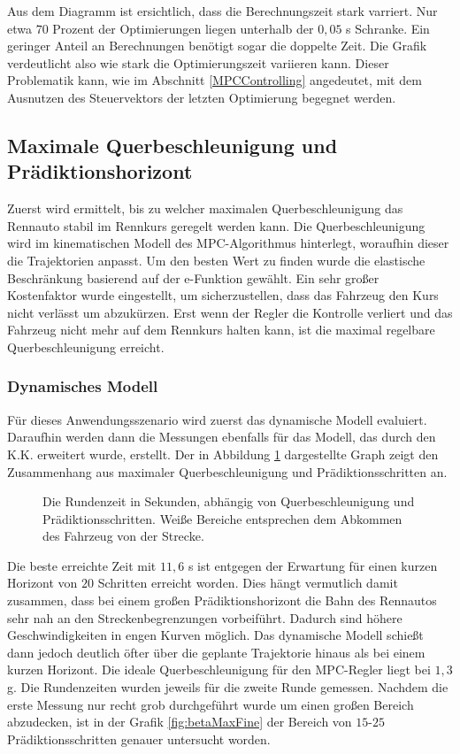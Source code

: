 \documentclass{like}
\begin{document}
Aus dem Diagramm ist ersichtlich, dass die Berechnungszeit stark varriert. Nur etwa $70$ Prozent der Optimierungen liegen unterhalb der $0,05$ s Schranke. Ein geringer Anteil an Berechnungen benötigt sogar die doppelte Zeit. Die Grafik verdeutlicht also wie stark die Optimierungszeit variieren kann. Dieser Problematik kann, wie im Abschnitt \ref{MPCControlling} angedeutet, mit dem Ausnutzen des Steuervektors der letzten Optimierung begegnet werden.

\subsection{Maximale Querbeschleunigung und Prädiktionshorizont}
Zuerst wird ermittelt, bis zu welcher maximalen Querbeschleunigung  das Rennauto stabil im Rennkurs geregelt werden kann. Die Querbeschleunigung wird im kinematischen Modell des \ac{MPC}-Algorithmus hinterlegt, woraufhin dieser die Trajektorien anpasst. Um den besten Wert zu finden wurde die elastische Beschränkung basierend auf der e-Funktion gewählt. Ein sehr großer Kostenfaktor wurde eingestellt, um sicherzustellen, dass das Fahrzeug den Kurs nicht verlässt um abzukürzen. Erst wenn der Regler die Kontrolle verliert und das Fahrzeug nicht mehr auf dem Rennkurs halten kann, ist die maximal regelbare Querbeschleunigung erreicht.

\subsubsection{Dynamisches Modell}
Für dieses Anwendungsszenario wird zuerst das dynamische Modell evaluiert. Daraufhin werden dann die Messungen ebenfalls für das Modell, das durch den \ac{K.K.} erweitert wurde, erstellt.
Der in Abbildung \ref{fig:betaMaxN} dargestellte Graph zeigt den Zusammenhang aus maximaler Querbeschleunigung und Prädiktionsschritten an. 
\begin{figure}[ht!]
	\centering
	 
	\caption{Die Rundenzeit in Sekunden, abhängig von Querbeschleunigung und Prädiktionsschritten. Weiße Bereiche entsprechen dem Abkommen des Fahrzeug von der Strecke.}
	\label{fig:betaMaxN}
\end{figure}

Die beste erreichte Zeit mit $11,6$ s ist entgegen der Erwartung für einen kurzen Horizont von $20$ Schritten erreicht worden. Dies hängt vermutlich damit zusammen, dass bei einem großen Prädiktionshorizont die Bahn des Rennautos sehr nah an den Streckenbegrenzungen vorbeiführt. Dadurch sind höhere Geschwindigkeiten in engen Kurven möglich. Das dynamische Modell schießt dann jedoch deutlich öfter über die geplante Trajektorie hinaus als bei einem kurzen Horizont. Die ideale Querbeschleunigung für den \ac{MPC}-Regler liegt bei $1,3$ g. Die Rundenzeiten wurden jeweils für die zweite Runde gemessen. Nachdem die erste Messung nur recht grob durchgeführt wurde um einen großen Bereich abzudecken, ist in der Grafik \ref{fig:betaMaxFine} der Bereich von $15$-$25$ Prädiktionsschritten genauer untersucht worden.
\end{document}
